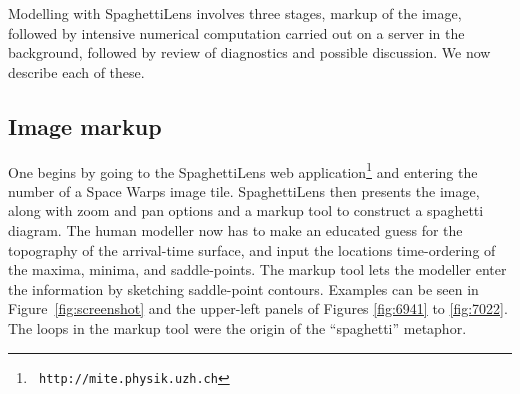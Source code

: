 \documentclass[usenatbib]{mn2e}
\newcommand{\spl}{SpaghettiLens\xspace}
\newcommand{\sw}{Space Warps\xspace}
\begin{document}
%
%

Modelling with \spl involves three stages, markup of the image,
followed by intensive numerical computation carried out on a
server in the background, followed by review
of diagnostics and possible discussion.  We now describe each of
these.



\subsection{Image markup}

One begins by going to the \spl web application\footnote{\tt
http://mite.physik.uzh.ch} and entering the number of a
\sw image tile.  \spl then presents the image, along with zoom and pan
options and a markup tool to construct a spaghetti diagram.  The human
modeller now has to make an educated guess for the topography of the
arrival-time surface, and input the locations time-ordering of the
maxima, minima, and saddle-points.  The markup tool \citep[which is
inspired by Figure~6 of][and is like that figure made interactive and
overlaid on data]{1986ApJ...310..568B} lets the modeller enter the
information by sketching saddle-point contours.  Examples can be seen in Figure~\ref{fig:screenshot} and the upper-left
panels of Figures \ref{fig:6941} to \ref{fig:7022}.  The loops in the
markup tool were the origin of the ``spaghetti'' metaphor.
\end{document}
